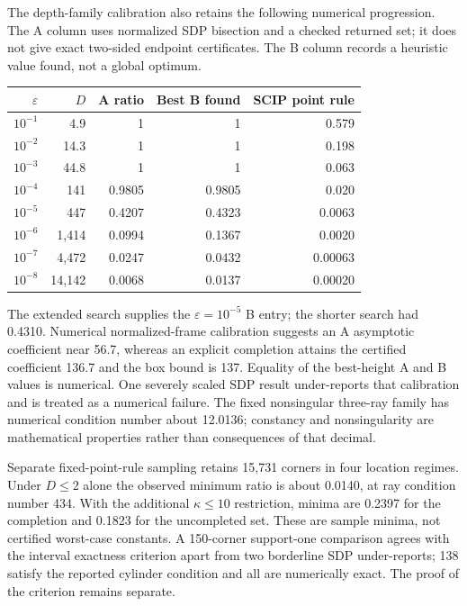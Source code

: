 The depth-family calibration also retains the following numerical
progression. The A column uses normalized SDP bisection and a checked
returned set; it does not give exact two-sided endpoint certificates.
The B column records a heuristic value found, not a global optimum.
\begin{center}
\begin{tabular}{@{}rrrrr@{}}
\toprule
$\varepsilon$ & $D$ & A ratio & Best B found & SCIP point rule \\
\midrule
$10^{-1}$ & 4.9 & 1 & 1 & 0.579 \\
$10^{-2}$ & 14.3 & 1 & 1 & 0.198 \\
$10^{-3}$ & 44.8 & 1 & 1 & 0.063 \\
$10^{-4}$ & 141 & 0.9805 & 0.9805 & 0.020 \\
$10^{-5}$ & 447 & 0.4207 & 0.4323 & 0.0063 \\
$10^{-6}$ & 1,414 & 0.0994 & 0.1367 & 0.0020 \\
$10^{-7}$ & 4,472 & 0.0247 & 0.0432 & 0.00063 \\
$10^{-8}$ & 14,142 & 0.0068 & 0.0137 & 0.00020 \\
\bottomrule
\end{tabular}
\end{center}
The extended search supplies the $\varepsilon=10^{-5}$ B entry;
the shorter search had 0.4310. Numerical normalized-frame calibration
suggests an A asymptotic coefficient near 56.7, whereas an explicit
completion attains the certified coefficient 136.7 and the box bound
is 137. Equality of the best-height A and B values is numerical.
One severely scaled SDP result under-reports that calibration and is
treated as a numerical failure. The fixed nonsingular three-ray family
has numerical condition number about 12.0136; constancy and nonsingularity
are mathematical properties rather than consequences of that decimal.

Separate fixed-point-rule sampling retains 15,731 corners in four
location regimes. Under $D\le 2$ alone the observed minimum ratio is
about 0.0140, at ray condition number 434. With the additional
$\kappa\le 10$ restriction, minima are 0.2397 for the completion and
0.1823 for the uncompleted set. These are sample minima, not certified
worst-case constants. A 150-corner support-one comparison agrees with
the interval exactness criterion apart from two borderline SDP
under-reports; 138 satisfy the reported cylinder condition and all are
numerically exact. The proof of the criterion remains separate.


